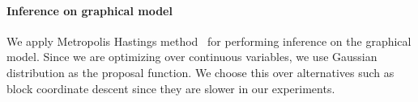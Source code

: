 

%



\vspace{-0.3cm}
\paragraph{Inference on graphical model}
We apply Metropolis Hastings method~\cite{mackay1998introduction} for performing inference on the graphical model. Since we are optimizing over continuous variables, we use Gaussian distribution as the proposal function. We choose this over alternatives such as block coordinate descent since they are slower in our experiments.


